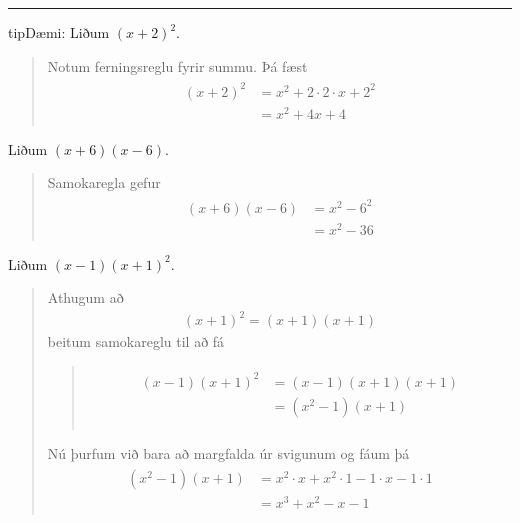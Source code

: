 \documentclass[a4paper,10pt,icelandic]{sphinxmanual}
\begin{document}
\bigskip\hrule\bigskip


\begin{sphinxadmonition}{tip}{Dæmi:}
 Liðum \((x+2)^2\).
\begin{quote}

Notum ferningsreglu fyrir summu. Þá fæst
\begin{equation*}
\begin{split}\begin{aligned}(x+2)^2&=x^2+2 \cdot 2 \cdot x + 2^2\\ &=x^2+4x+4 \end{aligned}\end{split}
\end{equation*}\end{quote}

 Liðum \((x+6)(x-6)\).
\begin{quote}

Samokaregla gefur
\begin{equation*}
\begin{split}\begin{aligned} (x+6)(x-6)&=x^2-6^2\\ &=x^2-36 \end{aligned}\end{split}
\end{equation*}\end{quote}

 Liðum \((x-1)(x+1)^2\).
\begin{quote}

Athugum að
\begin{equation*}
\begin{split}(x+1)^2=(x+1)(x+1)\end{split}
\end{equation*}
beitum samokareglu til að fá
\begin{quote}
\begin{equation*}
\begin{split}\begin{aligned} (x-1)(x+1)^2&=(x-1)(x+1)(x+1)\\ &=(x^2-1)(x+1)\\ \end{aligned}\end{split}
\end{equation*}\end{quote}

Nú þurfum við bara að margfalda úr svigunum og fáum þá
\begin{equation*}
\begin{split}\begin{aligned}
(x^2-1)(x+1)&=x^2 \cdot x + x^2 \cdot 1 - 1 \cdot x - 1 \cdot 1\\
&=x^3 + x^2 -x -1
\end{aligned}\end{split}
\end{equation*}\end{quote}


\end{sphinxadmonition}
\end{document}
